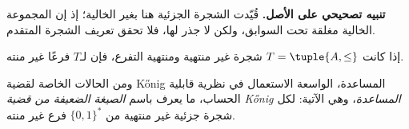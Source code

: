 \documentclass[../../../include/open-logic-section]{subfiles}
\begin{document}
\textbf{تنبيه تصحيحي على الأصل.} قُيّدت الشجرة الجزئية هنا بغير الخالية؛
إذ إن المجموعة الخالية مغلقة تحت السوابق، ولكن لا جذر لها، فلا تحقق تعريف
الشجرة المتقدم.

\begin{prop}
إذا كانت $T = \tuple{A,\le}$ شجرة غير منتهية ومنتهية التفرع، فإن لـ$T$
فرعًا غير منته.
\end{prop}

ومن الحالات الخاصة لقضية \foreignlanguage{english}{K\H{o}nig} المساعدة، الواسعة الاستعمال في نظرية
قابلية الحساب، ما يعرف باسم \emph{الصيغة الضعيفة من قضية \foreignlanguage{english}{K\H{o}nig} المساعدة}، وهي الآتية:
لكل شجرة جزئية غير منتهية من $\{0,1\}^*$ فرع غير منته.
\end{document}
